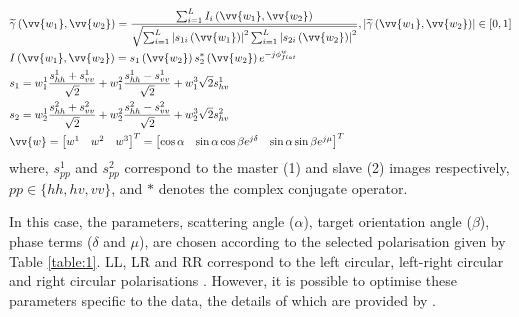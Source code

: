 \documentclass[12pt]{elsarticle}
\numberwithin{equation}{section}
\numberwithin{figure}{section}
\numberwithin{table}{section}
\begin{document}
\begin{subequations}
    \centering
    \begin{align}
        \label{seq:coh} 
        & \widetilde{\gamma}\left(\vv{w_1}, \vv{w_2}\right) = \frac{\sum_{i=1}^LI_i\left(\vv{w_1}, \vv{w_2}\right)}{\sqrt{\sum_{i=1}^L\left\lvert s_{1i}\left(\vv{w_1}\right)\right\rvert^2\sum_{i=1}^L\left\lvert s_{2i}\left(\vv{w_2}\right)\right\rvert^2}}, \left\lvert\widetilde{\gamma}\left(\vv{w_1}, \vv{w_2}\right)\right\rvert  \in [0, 1] \\
        \label{seq:ifg} 
        & I\left(\vv{w_1}, \vv{w_2}\right) = s_1\left(\vv{w_2}\right)s_2^*\left(\vv{w_2}\right)e^{-j\phi_{flat}^w} \\
        \label{seq:s1} 
        & s_1 = w_1^1\frac{s_{hh}^1 + s_{vv}^1}{\sqrt{2}} + w_1^2\frac{s_{hh}^1 - s_{vv}^1}{\sqrt{2}} + w_1^3\sqrt{2}s_{hv}^1 \\
        \label{seq:s2} 
        & s_2 = w_2^1\frac{s_{hh}^2 + s_{vv}^2}{\sqrt{2}} + w_2^2\frac{s_{hh}^2 - s_{vv}^2}{\sqrt{2}} + w_2^3\sqrt{2}s_{hv}^2 \\
        \label{seq:weight}
        & \vv{w} = \begin{bmatrix}
                    w^1 & w^2 & w^3
                    \end{bmatrix}^T = \begin{bmatrix}
                    \cos\alpha & \sin\alpha \cos{\beta{e}^{j\delta}} & \sin\alpha\sin{\beta{e}^{j\mu}}
                    \end{bmatrix}^T
    \end{align}
\end{subequations}
where, $s_{pp}^1$ and $s_{pp}^2$ correspond to the master (1) and slave (2) images respectively, $pp \in \{hh, hv, vv\}$,
and $*$ denotes the complex conjugate operator.

In this case, the parameters, scattering angle ($\alpha$), target orientation angle ($\beta$), phase terms ($\delta$ and $\mu$), are chosen according to the selected polarisation given by Table \ref{table:1}. LL, LR and RR correspond to the left circular, left-right circular and right circular polarisations \citep{Cloude2010}. However, it is possible to optimise these parameters specific to the data, the details of which are provided by \cite{Cloude2010}.
\end{document}
